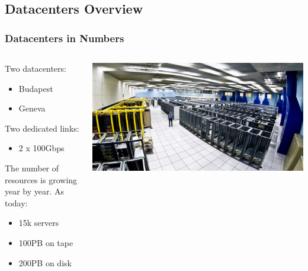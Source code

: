 \documentclass[aspectratio=169]{beamer}
\begin{document}
\subsection{Datacenters Overview}
\begin{frame}
    \frametitle{Datacenters in Numbers}
    \begin{minipage}[t]{0.95\textwidth}
        \begin{columns}[T]
            \begin{column}{0.5\textwidth}
                Two datacenters:
                \begin{itemize}
                    \item Budapest
                    \item Geneva
                \end{itemize}
                Two dedicated links:
                \begin{itemize}
                    \item 2 x 100Gbps
                \end{itemize}
                \vspace{0.1in} 
                The number of resources is growing year by year.
                As today:
                \begin{itemize}
                    \item 15k servers
                    \item 100PB on tape
                    \item 200PB on disk
                \end{itemize}
            \end{column}
            \begin{column}{0.5\textwidth}
                \vspace{0.2in} 
                \includegraphics[width=1.1\textwidth]{DC_overview.png}
            \end{column}
        \end{columns}
    \end{minipage}
\end{frame}
\end{document}
